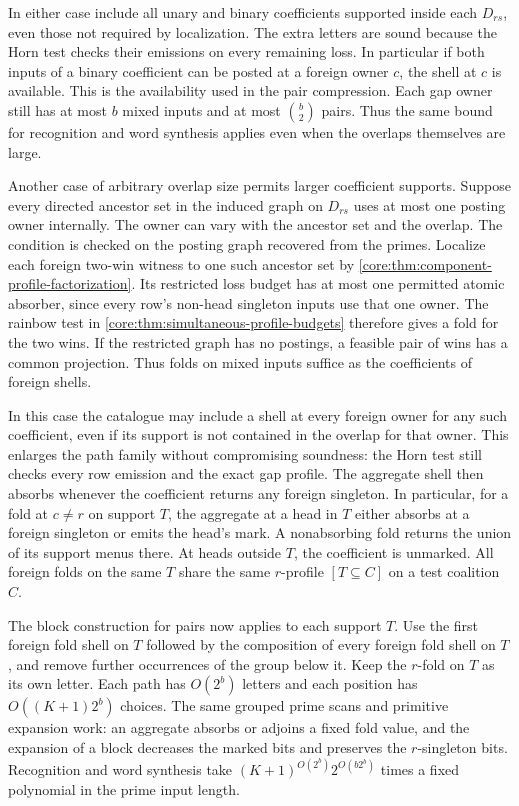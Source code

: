 In either case include all unary and binary coefficients
supported inside each $D_{rs}$, even those not required
by localization. The extra letters are sound because the
Horn test checks their emissions on every remaining loss.
In particular if both inputs of a binary coefficient can
be posted at a foreign owner $c$, the shell at $c$ is
available. This is the availability used in the pair
compression. Each gap owner still has at most $b$ mixed
inputs and at most $\binom b2$ pairs. Thus the same
bound for recognition and word synthesis applies even
when the overlaps themselves are large.

Another case of arbitrary overlap size permits larger
coefficient supports. Suppose every directed ancestor
set in the induced graph on $D_{rs}$ uses at most one
posting owner internally. The owner can vary with the
ancestor set and the overlap. The condition is checked
on the posting graph recovered from the primes.
Localize each foreign two-win witness to one such
ancestor set by \cref{core:thm:component-profile-factorization}.
Its restricted loss budget has at most one permitted
atomic absorber, since every row's non-head singleton
inputs use that one owner. The rainbow test in
\cref{core:thm:simultaneous-profile-budgets} therefore
gives a fold for the two wins. If the restricted graph
has no postings, a feasible pair of wins has a common
projection. Thus folds on mixed inputs suffice as the
coefficients of foreign shells.

In this case the catalogue may include a shell at every
foreign owner for any such coefficient, even if its
support is not contained in the overlap for that owner.
This enlarges the path family without compromising
soundness: the Horn test still checks every row
emission and the exact gap profile. The aggregate shell
then absorbs whenever the coefficient returns any
foreign singleton. In particular, for a fold at
$c\ne r$ on support $T$, the aggregate at a head in $T$
either absorbs at a foreign singleton or emits the
head's mark. A nonabsorbing fold returns the union of
its support menus there. At heads outside $T$, the
coefficient is unmarked. All foreign folds on the same
$T$ share the same $r$-profile $[T\subseteq C]$ on a
test coalition $C$.

The block construction for pairs now applies to each
support $T$. Use the first foreign fold shell on $T$
followed by the composition of every foreign fold
shell on $T$, and remove further occurrences of the
group below it. Keep the $r$-fold on $T$ as its own
letter. Each path has $O(2^b)$ letters and each position
has $O((K+1)2^b)$ choices. The same grouped prime scans
and primitive expansion work: an aggregate absorbs or
adjoins a fixed fold value, and the expansion of a
block decreases the marked bits and preserves the
$r$-singleton bits. Recognition and word synthesis
take $(K+1)^{O(2^b)}2^{O(b2^b)}$ times a fixed
polynomial in the prime input length.

